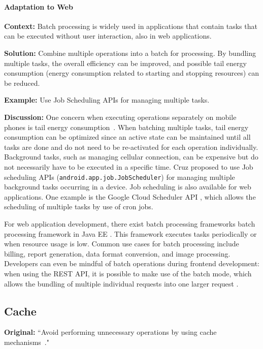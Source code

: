 \paragraph{Adaptation to Web}\mbox{}

\textbf{Context:} Batch processing is widely used in applications that contain tasks that can be executed without user interaction, also in web applications.

\textbf{Solution:} Combine multiple operations into a batch for processing. By bundling multiple tasks, the overall efficiency can be improved, and possible tail energy consumption (energy consumption related to starting and stopping resources) can be reduced.

\textbf{Example:} Use Job Scheduling APIs for managing multiple tasks.



\textbf{Discussion:} One concern when executing operations separately on mobile phones is tail energy consumption~\cite{cruz2019catalog}. When batching multiple tasks, tail energy consumption can be optimized since an active state can be maintained until all tasks are done and do not need to be re-activated for each operation individually. Background tasks, such as managing cellular connection, can be expensive but do not necessarily have to be executed in a specific time. Cruz \etal proposed to use Job scheduling APIs (\eg \texttt{android.app.job.JobScheduler}) for managing multiple background tasks occurring in a device. Job scheduling is also available for web applications. One example is the Google Cloud Scheduler API \cite{Google-cloude-scheduler-api}, which allows the scheduling of multiple tasks by use of cron jobs.

For web application development, there exist batch processing frameworks \eg batch processing framework in Java EE \cite{javaee-batch-processing}. This framework executes tasks periodically or when resource usage is low.
Common use cases for batch processing include billing, report generation, data format conversion, and image processing. Developers can even be mindful of batch operations during frontend development: when using the REST API, it is possible to make use of the batch mode, which allows the bundling of multiple individual requests into one larger request \cite{rest-api-batch-example} \cite{MicrosoftAPI}.


\subsection{Cache} \label{sec:patterns-Cache}
\textbf{Original:} ``Avoid performing unnecessary operations by using cache mechanisms~\cite{cruz2019catalog}."

